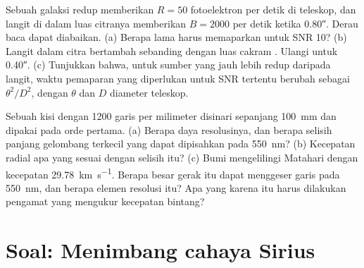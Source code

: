 \begin{exercise}[$\star\star\star$]\label{exo:b1:observing-the-sky:11}
Sebuah galaksi redup memberikan $R = 50$ fotoelektron per detik di teleskop, dan langit di dalam luas citranya memberikan $B = \num{2000}$ per detik ketika  \ang{;;0.80}. Derau baca dapat diabaikan. (a) Berapa lama harus memaparkan untuk SNR 10? (b) Langit dalam citra bertambah sebanding dengan luas cakram . Ulangi untuk  \ang{;;0.40}. (c) Tunjukkan bahwa, untuk sumber yang jauh lebih redup daripada langit, waktu pemaparan yang diperlukan untuk SNR tertentu berubah sebagai $\theta^2/D^2$, dengan $\theta$  dan $D$ diameter teleskop.
\end{exercise}

\begin{exercise}[$\star\star\star$]\label{exo:b1:observing-the-sky:12}
Sebuah kisi dengan 1200 garis per milimeter disinari sepanjang \qty{100}{mm} dan dipakai pada orde pertama. (a) Berapa daya resolusinya, dan berapa selisih panjang gelombang terkecil yang dapat dipisahkan pada \qty{550}{nm}? (b) Kecepatan radial apa yang sesuai dengan selisih itu? (c) Bumi mengelilingi Matahari dengan kecepatan \qty{29.78}{km.s^{-1}}. Berapa besar gerak itu dapat menggeser garis pada \qty{550}{nm}, dan berapa elemen resolusi itu? Apa yang karena itu harus dilakukan pengamat yang mengukur kecepatan bintang?
\end{exercise}

\section{Soal: Menimbang cahaya Sirius}

